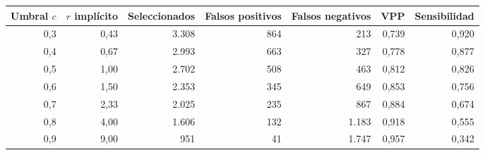 \begin{tabular}{@{}rrrrrrr@{}}
\toprule
Umbral $c$ & $r$ implícito & Seleccionados & Falsos positivos & Falsos negativos & VPP & Sensibilidad \\
\midrule
0,3 & 0,43 & 3.308 & 864 & 213 & 0,739 & 0,920 \\
0,4 & 0,67 & 2.993 & 663 & 327 & 0,778 & 0,877 \\
0,5 & 1,00 & 2.702 & 508 & 463 & 0,812 & 0,826 \\
0,6 & 1,50 & 2.353 & 345 & 649 & 0,853 & 0,756 \\
0,7 & 2,33 & 2.025 & 235 & 867 & 0,884 & 0,674 \\
0,8 & 4,00 & 1.606 & 132 & 1.183 & 0,918 & 0,555 \\
0,9 & 9,00 & 951 & 41 & 1.747 & 0,957 & 0,342 \\
\bottomrule
\end{tabular}